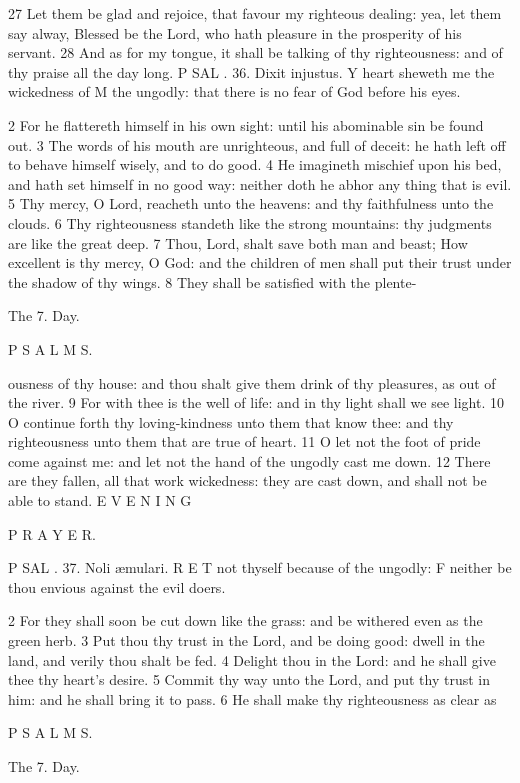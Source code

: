 27 Let them be glad and rejoice, that favour my righteous dealing: yea, let them say alway, Blessed be the Lord, who hath pleasure in the prosperity of his servant. 28 And as for my tongue, it shall be talking of thy righteousness: and of thy praise all the day long. P SAL . 36. Dixit injustus. Y heart sheweth me the wickedness of M the ungodly: that there is no fear of God before his eyes.

2 For he flattereth himself in his own sight: until his abominable sin be found out. 3 The words of his mouth are unrighteous, and full of deceit: he hath left off to behave himself wisely, and to do good. 4 He imagineth mischief upon his bed, and hath set himself in no good way: neither doth he abhor any thing that is evil. 5 Thy mercy, O Lord, reacheth unto the heavens: and thy faithfulness unto the clouds. 6 Thy righteousness standeth like the strong mountains: thy judgments are like the great deep. 7 Thou, Lord, shalt save both man and beast; How excellent is thy mercy, O God: and the children of men shall put their trust under the shadow of thy wings. 8 They shall be satisfied with the plente-

The 7. Day.

P S A L M S.

ousness of thy house: and thou shalt give them drink of thy pleasures, as out of the river. 9 For with thee is the well of life: and in thy light shall we see light. 10 O continue forth thy loving-kindness unto them that know thee: and thy righteousness unto them that are true of heart. 11 O let not the foot of pride come against me: and let not the hand of the ungodly cast me down. 12 There are they fallen, all that work wickedness: they are cast down, and shall not be able to stand. E V E N I N G

P R A Y E R.

P SAL . 37. Noli æmulari. R E T not thyself because of the ungodly: F neither be thou envious against the evil doers.

2 For they shall soon be cut down like the grass: and be withered even as the green herb. 3 Put thou thy trust in the Lord, and be doing good: dwell in the land, and verily thou shalt be fed. 4 Delight thou in the Lord: and he shall give thee thy heart’s desire. 5 Commit thy way unto the Lord, and put thy trust in him: and he shall bring it to pass. 6 He shall make thy righteousness as clear as

P S A L M S.

The 7. Day.

